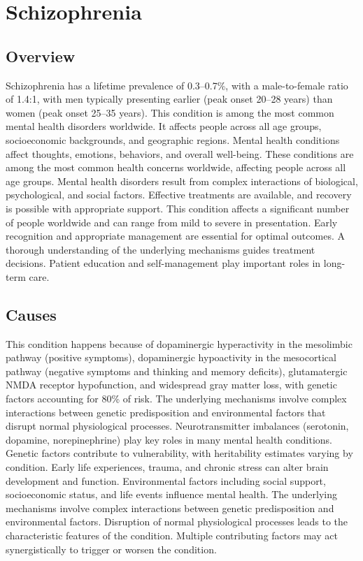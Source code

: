 \chapter{Schizophrenia}
\label{sec:Schizophrenia}

\section{Overview}
Schizophrenia has a lifetime prevalence of 0.3--0.7\%, with a male-to-female ratio of 1.4:1, with men typically presenting earlier (peak onset 20--28 years) than women (peak onset 25--35 years). This condition is among the most common mental health disorders worldwide. It affects people across all age groups, socioeconomic backgrounds, and geographic regions. Mental health conditions affect thoughts, emotions, behaviors, and overall well-being. These conditions are among the most common health concerns worldwide, affecting people across all age groups. Mental health disorders result from complex interactions of biological, psychological, and social factors. Effective treatments are available, and recovery is possible with appropriate support. This condition affects a significant number of people worldwide and can range from mild to severe in presentation. Early recognition and appropriate management are essential for optimal outcomes. A thorough understanding of the underlying mechanisms guides treatment decisions. Patient education and self-management play important roles in long-term care.
\section{Causes}
This condition happens because of dopaminergic hyperactivity in the mesolimbic pathway (positive symptoms), dopaminergic hypoactivity in the mesocortical pathway (negative symptoms and thinking and memory deficits), glutamatergic NMDA receptor hypofunction, and widespread gray matter loss, with genetic factors accounting for 80\% of risk. The underlying mechanisms involve complex interactions between genetic predisposition and environmental factors that disrupt normal physiological processes. Neurotransmitter imbalances (serotonin, dopamine, norepinephrine) play key roles in many mental health conditions. Genetic factors contribute to vulnerability, with heritability estimates varying by condition. Early life experiences, trauma, and chronic stress can alter brain development and function. Environmental factors including social support, socioeconomic status, and life events influence mental health. The underlying mechanisms involve complex interactions between genetic predisposition and environmental factors. Disruption of normal physiological processes leads to the characteristic features of the condition. Multiple contributing factors may act synergistically to trigger or worsen the condition.
